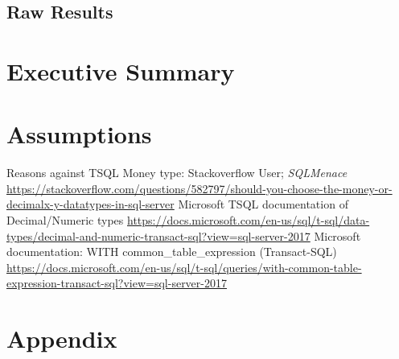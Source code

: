 \documentclass{article}
\newcounter{num}
\begin{document}
        \subsection{Raw Results}

    \newpage
    \section{Executive Summary}

    \newpage
    \section{Assumptions}

    \newpage
    \begin{thebibliography}{9}
        \raggedright
            Reasons against TSQL Money type: Stackoverflow User; \textit{SQLMenace}
            \url{https://stackoverflow.com/questions/582797/should-you-choose-the-money-or-decimalx-y-datatypes-in-sql-server}
            Microsoft TSQL documentation of Decimal/Numeric types
            \url{https://docs.microsoft.com/en-us/sql/t-sql/data-types/decimal-and-numeric-transact-sql?view=sql-server-2017}
        Microsoft documentation: WITH common\_table\_expression (Transact-SQL)
            \url{https://docs.microsoft.com/en-us/sql/t-sql/queries/with-common-table-expression-transact-sql?view=sql-server-2017}
    \end{thebibliography}

    \newpage
    \section{Appendix}
    \label{sec:Appendix}

    
\end{document}
